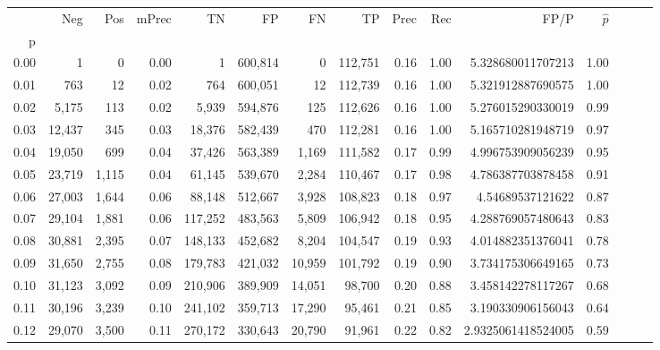 \begin{tabular}{rrrrrrrrrrrrrrr}
\toprule
{} &     Neg &    Pos & mPrec &       TN &       FP &       FN &       TP &  Prec &   Rec &                    FP/P & $\hat{p}$ \\
p    &         &        &       &          &          &          &          &       &       &                         &           \\
\midrule
0.00 &       1 &      0 &  0.00 &        1 &  600,814 &        0 &  112,751 &  0.16 &  1.00 &       5.328680011707213 &      1.00 \\
0.01 &     763 &     12 &  0.02 &      764 &  600,051 &       12 &  112,739 &  0.16 &  1.00 &       5.321912887690575 &      1.00 \\
0.02 &   5,175 &    113 &  0.02 &    5,939 &  594,876 &      125 &  112,626 &  0.16 &  1.00 &       5.276015290330019 &      0.99 \\
0.03 &  12,437 &    345 &  0.03 &   18,376 &  582,439 &      470 &  112,281 &  0.16 &  1.00 &       5.165710281948719 &      0.97 \\
0.04 &  19,050 &    699 &  0.04 &   37,426 &  563,389 &    1,169 &  111,582 &  0.17 &  0.99 &       4.996753909056239 &      0.95 \\
0.05 &  23,719 &  1,115 &  0.04 &   61,145 &  539,670 &    2,284 &  110,467 &  0.17 &  0.98 &       4.786387703878458 &      0.91 \\
0.06 &  27,003 &  1,644 &  0.06 &   88,148 &  512,667 &    3,928 &  108,823 &  0.18 &  0.97 &        4.54689537121622 &      0.87 \\
0.07 &  29,104 &  1,881 &  0.06 &  117,252 &  483,563 &    5,809 &  106,942 &  0.18 &  0.95 &       4.288769057480643 &      0.83 \\
0.08 &  30,881 &  2,395 &  0.07 &  148,133 &  452,682 &    8,204 &  104,547 &  0.19 &  0.93 &       4.014882351376041 &      0.78 \\
0.09 &  31,650 &  2,755 &  0.08 &  179,783 &  421,032 &   10,959 &  101,792 &  0.19 &  0.90 &       3.734175306649165 &      0.73 \\
0.10 &  31,123 &  3,092 &  0.09 &  210,906 &  389,909 &   14,051 &   98,700 &  0.20 &  0.88 &       3.458142278117267 &      0.68 \\
0.11 &  30,196 &  3,239 &  0.10 &  241,102 &  359,713 &   17,290 &   95,461 &  0.21 &  0.85 &       3.190330906156043 &      0.64 \\
0.12 &  29,070 &  3,500 &  0.11 &  270,172 &  330,643 &   20,790 &   91,961 &  0.22 &  0.82 &      2.9325061418524005 &      0.59 \\

\end{tabular}
